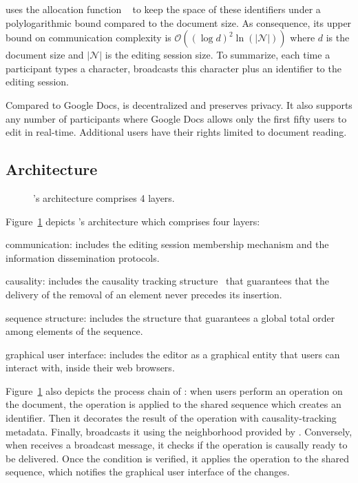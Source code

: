 
\CRATE uses the allocation function \LSEQ~\cite{nedelec2013lseq} to keep the
space of these identifiers under a polylogarithmic bound compared to the
document size. As consequence, its upper bound on communication complexity is
$\mathcal{O}((\log d)^2\ln(|\mathcal{N}|))$ where $d$ is the document size and
$|\mathcal{N}|$ is the editing session size. To summarize, each time a
participant types a character, \CRATE broadcasts this character plus an identifier
to the editing session.

Compared to Google Docs, \CRATE is decentralized and preserves
privacy. It also supports any number of participants where Google Docs
allows only the first fifty users to edit in real-time. Additional
users have their rights limited to document reading.

\subsection{Architecture}

\begin{figure}
  \centering
  
  \caption{\label{fig:architecture}\CRATE's architecture comprises 4
    layers.}
\end{figure}

Figure~\ref{fig:architecture} depicts \CRATE's architecture which comprises four
layers:
\begin{inparaenum}[(i)]
\item communication: includes the editing session membership mechanism and the
  information dissemination protocols.
\item causality: includes the causality tracking
  structure~\cite{malkhi2007concise} that guarantees that the delivery of the
  removal of an element never precedes its insertion.
\item sequence structure: includes the structure that guarantees a global
  total order among elements of the sequence.
\item graphical user interface: includes the editor as a graphical
  entity that users can interact with, inside their web browsers.
\end{inparaenum}
Figure~\ref{fig:architecture} also depicts the process chain of \CRATE: when
users perform an operation on the document, the operation is applied to the
shared sequence which creates an \LSEQ identifier. Then it decorates the result
of the operation with causality-tracking metadata. Finally, \CRATE broadcasts it
using the neighborhood provided by \SPRAY.  Conversely, when \CRATE receives a
broadcast message, it checks if the operation is causally ready to be
delivered. Once the condition is verified, it applies the operation to the
shared sequence, which notifies the graphical user interface of the changes.

